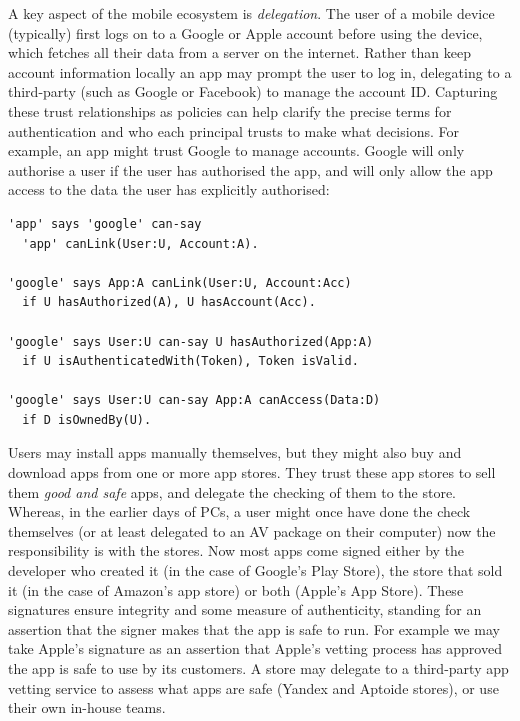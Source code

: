 \documentclass[thesis.tex]{subfiles}
\begin{document}
\vspace{1em}

A key aspect of the mobile ecosystem is \emph{delegation}. The user of a mobile
device (typically) first logs on to a Google or Apple account before using the
device, which fetches all their data from a server on the internet. Rather than
keep account information locally an app may prompt the user to log in,
delegating to a third-party (such as Google or Facebook) to manage the account
ID. Capturing these trust relationships as policies can help clarify the precise
terms for authentication and who each principal trusts to make what decisions.
For example, an app might trust Google to manage accounts. Google will only
authorise a user if the user has authorised the app, and will only allow the app
access to the data the user has explicitly authorised:

\begin{lstlisting}
'app' says 'google' can-say 
  'app' canLink(User:U, Account:A).

'google' says App:A canLink(User:U, Account:Acc)
  if U hasAuthorized(A), U hasAccount(Acc).

'google' says User:U can-say U hasAuthorized(App:A)
  if U isAuthenticatedWith(Token), Token isValid.

'google' says User:U can-say App:A canAccess(Data:D)
  if D isOwnedBy(U).
\end{lstlisting}

Users may install apps manually themselves, but they might also buy and download
apps from one or more app stores. They trust these app stores to sell them
\emph{good and safe} apps, and delegate the checking of them to the store.
Whereas, in the earlier days of PCs, a user might once have done the check
themselves (or at least delegated to an \ac{AV} package on their computer) now
the responsibility is with the stores. Now most apps come signed either by the
developer who created it (in the case of Google's Play Store), the store that
sold it (in the case of Amazon's app store) or both (Apple's App Store). These
signatures ensure integrity and some measure of authenticity, standing for an
assertion that the signer makes that the app is safe to run. For example we may
take Apple's signature as an assertion that Apple's vetting process has approved
the app is safe to use by its customers. A store may delegate to a third-party
app vetting service to assess what apps are safe (Yandex and Aptoide stores), or
use their own in-house teams.
\end{document}
